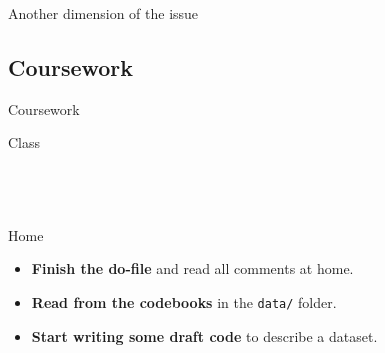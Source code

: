 \documentclass[t]{beamer}
\begin{document}
  \begin{frame}[c, plain]{}
  \end{frame}

  \begin{frame}[c, plain]{}
  \end{frame}

  \begin{frame}[c, plain]{}
  \end{frame}

  \begin{frame}[c, plain]{}
  \end{frame}

  \begin{frame}[c, plain]{}
  \end{frame}

  \begin{frame}[c, plain]{Another dimension of the issue}
  \end{frame}
	
	\subsection{Coursework}
  
	\begin{frame}[t]{Coursework}

    \begin{block}{Class}
      \\
      \\
      
			\\
			\\    
    \end{block}

    \begin{alertblock}{Home}
      \begin{itemize}
	       \item \textbf{Finish the do-file} and read all comments at home.
	       \item \textbf{Read from the codebooks} in the \texttt{data/} folder. 
	       \item \textbf{Start writing some draft code} to describe a dataset.
      \end{itemize}
    \end{alertblock}
    		
	\end{frame}
  
	
\end{document}
